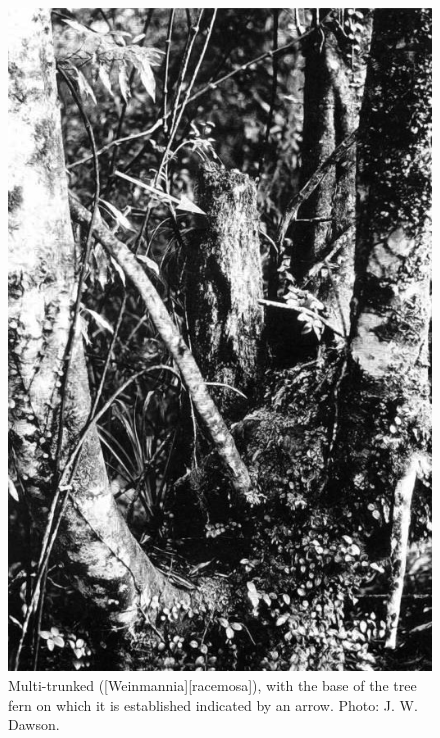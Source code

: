 \begin{figure}[t]
\begin{minipage}[t]{\textwidth}
\begin{minipage}[t]{(\textwidth-\fgap) * \real{0.478}}
			\centering
			\includegraphics[width=\textwidth]{graphics/fig_056}
			\caption[Multi-trunked kamahi]{Multi-trunked  ([Weinmannia][racemosa]), with the base of the tree fern on which it is established indicated by an arrow.
			Photo: J. W. Dawson.}%
			\label{fig:56kamahi}
		\end{minipage}
	\end{minipage}
\end{figure}

